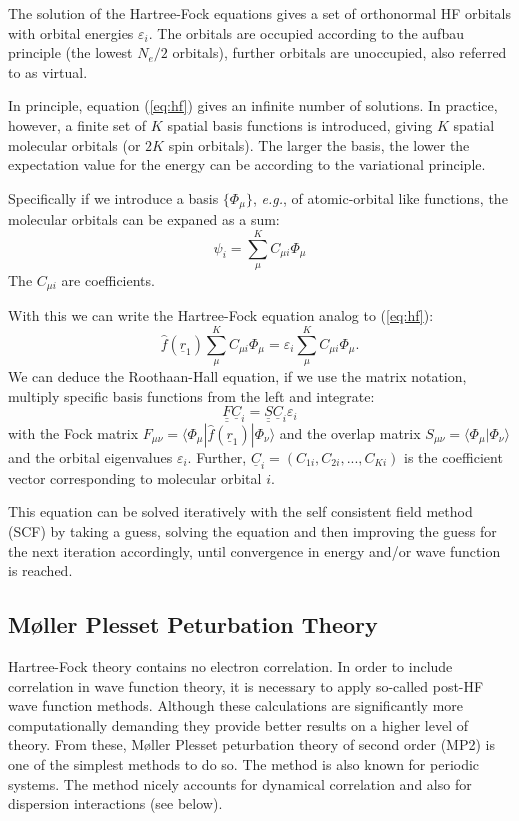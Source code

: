 \documentclass[11pt,DIV=13,BCOR=5mm,a4paper,headinclude]{scrbook}
\renewcommand{\vec}[1]{\underline{#1}}
\def\doubleunderline#1{\underline{\underline{#1}}}
\begin{document}
The solution of the Hartree-Fock equations gives a set of orthonormal HF orbitals with orbital energies $\varepsilon_i$.
The orbitals are occupied according to the aufbau principle (the lowest $N_e/2$ orbitals), further orbitals are unoccupied, also referred to as virtual. 

In principle, equation (\ref{eq:hf}) gives an infinite number of solutions.
In practice, however, a finite set of $K$ spatial basis functions is introduced, giving $K$ spatial molecular orbitals (or $2K$ spin orbitals).
The larger the basis, the lower the expectation value for the energy can be according to the variational principle.

Specifically if we introduce a basis $\{\Phi_\mu\}$, \textit{e.g.}, of atomic-orbital like functions, the molecular orbitals can be expaned as a sum:
\begin{equation}\label{eq:basis}
\psi_i=\sum_\mu^KC_{\mu i}\Phi_\mu
\end{equation}
The $C_{\mu i}$ are coefficients.

With this we can write the Hartree-Fock equation analog to (\ref{eq:hf}):
\begin{equation}
 \hat{f}(\vec{r}_1) \sum_\mu^KC_{\mu i}\Phi_\mu = \varepsilon_i \sum_\mu^KC_{\mu i}\Phi_\mu.
\end{equation}
We can deduce the Roothaan-Hall equation, if we use the matrix notation, multiply specific basis functions from the left and integrate:
\begin{equation}\label{eq:RH}
 \doubleunderline{F} \vec{C}_i=\doubleunderline{S} \vec{C}_i\varepsilon_i
\end{equation}
with the Fock matrix $F_{\mu\nu}=\langle \Phi_\mu|\hat{f}(\vec{r}_1)|\Phi_\nu\rangle$ and the overlap matrix $S_{\mu\nu}=\langle \Phi_\mu|\Phi_\nu\rangle$ and the orbital eigenvalues $\varepsilon_i$.
Further, $\vec{C}_i=(C_{1i}, C_{2i},...,C_{Ki})$ is the coefficient vector corresponding to molecular orbital $i$.

This equation can be solved iteratively with the self consistent field method (SCF) by taking a guess, solving the equation and then improving the guess for the next iteration accordingly, until convergence in energy and/or wave function is reached.


\subsection{M\o{}ller Plesset Peturbation Theory}
Hartree-Fock theory contains no electron correlation.
In order to include correlation in wave function theory, it is necessary to apply so-called post-HF wave function methods.
Although these calculations are significantly more computationally demanding they provide better results on a higher level of theory.
From these, M\o{}ller Plesset peturbation theory of second order (MP2)\cite{mollerplesset} is one of the simplest methods to do so.
The method is also known for periodic systems\cite{Suhai1984}.
The method nicely accounts for dynamical correlation and also for dispersion interactions (see below).
\end{document}
